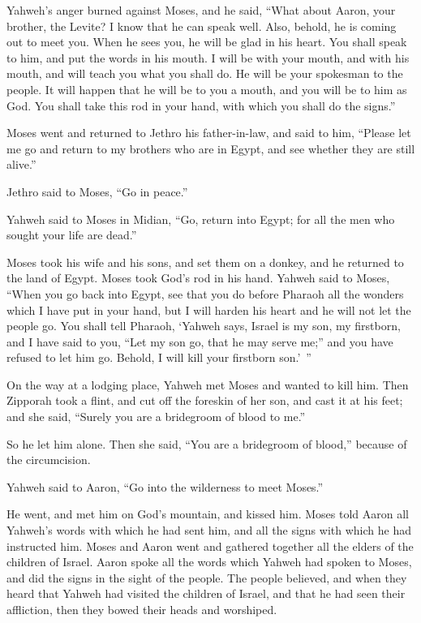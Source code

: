 {\par }{\PP {}Yahweh’s anger burned against Moses, and he said, “What about Aaron, your brother, the Levite? I know that he can speak well. Also, behold, he is coming out to meet you. When he sees you, he will be glad in his heart.
You shall speak to him, and put the words in his mouth. I will be with your mouth, and with his mouth, and will teach you what you shall do.
He will be your spokesman to the people. It will happen that he will be to you a mouth, and you will be to him as God.
You shall take this rod in your hand, with which you shall do the signs.”
\par }{\PP {}Moses went and returned to Jethro his father-in-law, and said to him, “Please let me go and return to my brothers who are in Egypt, and see whether they are still alive.”
\par }{\PP Jethro said to Moses, “Go in peace.”
\par }{\PP {}Yahweh said to Moses in Midian, “Go, return into Egypt; for all the men who sought your life are dead.”
\par }{\PP {}Moses took his wife and his sons, and set them on a donkey, and he returned to the land of Egypt. Moses took God’s rod in his hand.
Yahweh said to Moses, “When you go back into Egypt, see that you do before Pharaoh all the wonders which I have put in your hand, but I will harden his heart and he will not let the people go.
You shall tell Pharaoh, ‘Yahweh says, Israel is my son, my firstborn,
and I have said to you, “Let my son go, that he may serve me;” and you have refused to let him go. Behold, I will kill your firstborn son.’ ”
\par }{\PP {}On the way at a lodging place, Yahweh met Moses and wanted to kill him.
Then Zipporah took a flint, and cut off the foreskin of her son, and cast it at his feet; and she said, “Surely you are a bridegroom of blood to me.”
\par }{\PP {}So he let him alone. Then she said, “You are a bridegroom of blood,” because of the circumcision.
\par }{\PP {}Yahweh said to Aaron, “Go into the wilderness to meet Moses.”
\par }{\PP He went, and met him on God’s mountain, and kissed him.
Moses told Aaron all Yahweh’s words with which he had sent him, and all the signs with which he had instructed him.
Moses and Aaron went and gathered together all the elders of the children of Israel.
Aaron spoke all the words which Yahweh had spoken to Moses, and did the signs in the sight of the people.
The people believed, and when they heard that Yahweh had visited the children of Israel, and that he had seen their affliction, then they bowed their heads and worshiped.

}
